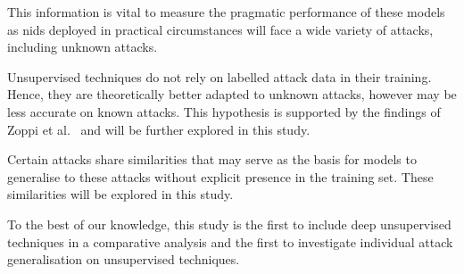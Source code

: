 \begin{center}
\end{center}

This information is vital to measure the pragmatic performance of these models
as \gls{nids} deployed in practical circumstances will face a wide variety of
attacks, including unknown attacks.

\begin{center}
\end{center}

Unsupervised techniques do not rely on labelled attack data in their training.
Hence, they are theoretically better adapted to unknown attacks, however may be
less accurate on known attacks. This hypothesis is supported by the findings of
Zoppi et al.~\cite{Zoppi} and will be further explored in this study.

\begin{center}
\end{center}

Certain attacks share similarities that may serve as the basis for models to
generalise to these attacks without explicit presence in the training set.
These similarities will be explored in this study.

To the best of our knowledge, this study is the first to include deep
unsupervised techniques in a comparative analysis and the first to investigate
individual attack generalisation on unsupervised techniques.

